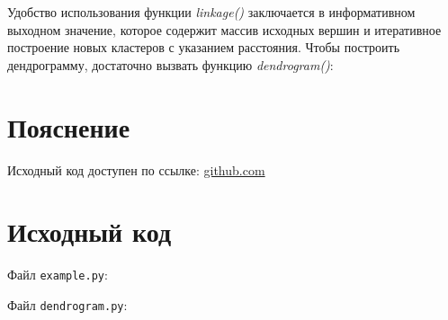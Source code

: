 \documentclass{article} %
\begin{document}
\noindent{}

\clearpage

Удобство использования функции \textit{linkage()} заключается в информативном выходном значение,
которое содержит массив исходных вершин и итеративное построение новых кластеров с указанием расстояния.
Чтобы построить дендрограмму, достаточно вызвать функцию \textit{dendrogram()}:

\noindent{}

\section{Пояснение}
Исходный код доступен по ссылке:
\href{https://github.com/SvichkarevAnatoly/Course-Python-Bioinformatics/tree/master/bioseq7}
{github.com}

\clearpage

\section{Исходный код}
Файл \verb$example.py$:


Файл \verb$dendrogram.py$:

\end{document}
